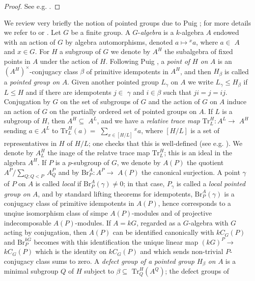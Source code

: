 \documentclass{amsart}
\theoremstyle{plain}\newtheorem{Theorem}{Theorem}[section]
\theoremstyle{plain}\newtheorem{Conjecture}[Theorem]{Conjecture}
\theoremstyle{plain}\newtheorem{Corollary}[Theorem]{Corollary}
\theoremstyle{plain}\newtheorem{Lemma}[Theorem]{Lemma}
\theoremstyle{plain}\newtheorem{Proposition}[Theorem]{Proposition}
\theoremstyle{definition}\newtheorem{Definition}[Theorem]{Definition}
\theoremstyle{definition}\newtheorem{Example}[Theorem]{Example}
\theoremstyle{definition}\newtheorem{Examples}[Theorem]{Examples}
\theoremstyle{definition}\newtheorem{Exercise}[Theorem]{Exercise}
\theoremstyle{definition}\newtheorem{Notation}[Theorem]{Notation}
\theoremstyle{definition}\newtheorem{Remark}[Theorem]{Remark}
\theoremstyle{definition}\newtheorem{Remarks}[Theorem]{Remarks}
\theoremstyle{plain}\newtheorem{Statement}[Theorem]{}
\def\Br{\mathrm{Br}}                 \def\ten{\otimes}
\def\Tr{\mathrm{Tr}}             \def\tenOT{\otimes_{\mathcal{O}T}}
\begin{document}
\begin{proof} See e.g. \cite[Theorem 5.1.16]{LiBookI}.
\end{proof}


\medskip
We review very briefly the
notion of pointed groups due to Puig \cite{Puigpoint}; for more details we refer to
 \cite[Sections 5.5, 5.6]{LiBookI} or \cite{Thev}. 
 Let $G$ be a finite group.
A $G$-{\em algebra} is a $k$-algebra $A$ endowed with an action of $G$ by
algebra automorphisms, denoted $a\mapsto {^x{a}}$, where $a\in$ $A$ and $x\in G$.
For $H$ a subgroup of $G$ we denote by $A^H$ the subalgebra of fixed points in $A$
under the action of $H$.  Following Puig \cite{Puigpoint}, a {\em point of $H$ on $A$}
is an $(A^H)^\times$-conjugacy class $\beta$ of primitive idempotents in $A^H$,
and then $H_\beta$ is called a {\em pointed group on $A$}. Given another pointed
group $L_\gamma$ on $A$ we write $L_\gamma\leq H_\beta$ if $L\leq H$ and if
there are idempotents $j\in$ $\gamma$ and $i\in \beta$ such that $ji=j=ij$.  Conjugation 
by $G$ on the set of subgroups of $G$ and the action of $G$ on $A$ induce an action of 
$G$ on the partially ordered set of pointed  groups on $A$. If $L$ is a subgroup of $H$, 
then $A^H\subseteq$ $A^L$,  and we  have a {\em relative trace map} 
$\Tr^H_L : A^L\to$ $A^H$ sending $a\in A^L$ to  $\Tr^H_L(a)=$ $\sum_{x\in [H/L]} {^x{a}}$, 
where $[H/L]$ is a set of representatives  in $H$ of $H/L$;  one checks that this is 
well-defined (see e.g.  \cite[Definition 2.5.1]{LiBookI}). We denote by $A^H_L$ the inage 
of the relatve trace map $\Tr^H_L$; this is an ideal in the algebra $A^H$. If $P$ is a 
$p$-subgroup of $G$, we denote by $A(P)$ the quotient $A^P/\sum_{Q; Q<P}\ A^P_Q$
and by $\Br_P^A : A^P\to$ $A(P)$ the canonical surjection. A point $\gamma$ of $P$ on
$A$ is called {\em local} if $\Br_P^A(\gamma)\neq 0$; in that case, $P_\gamma$ is
called a {\em local pointed group on $A$}, and by standard lifting theorems for
idempotents, $\Br^A_P(\gamma)$ is a conjugacy class of primitive idempotents 
in $A(P)$, hence corresponds to a unqiue isomorphism class of simpe $A(P)$-modules
and of projective indecomposable $A(P)$-modules.
If $A=kG$, regarded as a $G$-algebra with $G$ acting by conjugation,
then $A(P)$ can be identified canonically with $kC_G(P)$ and $\Br_P^{kG}$ 
becomes with this identification  the unique linear map $(kG)^P\to$ $kC_G(P)$ which 
is the identity on $kC_G(P)$ and which sends non-trivial $P$-conjugacy class sums to zero.  
A {\em defect group of a pointed group $H_\beta$ on $A$} is  a minimal subgroup 
$Q$ of $H$ subject to $\beta\subseteq$ $\Tr^H_Q(A^Q)$;  the defect groups of 
\end{document}
